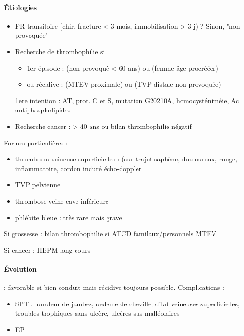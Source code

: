 \documentclass{article}
\begin{document}

\paragraph{Étiologies}
\begin{itemize}
  \item FR transitoire (chir, fracture < 3 mois, immobilisation > 3 j) ? Sinon, "non
provoquée"
\item Recherche de thrombophilie si
  \begin{itemize}
  \item 1er épisode :  (non provoqué < 60 ans) ou (femme âge procrééer)
  \item ou récidive : (MTEV proximale) ou (TVP distale non provoquée)
  \end{itemize}
  \thus 1ere intention : \gls{AT}, prot. C et S, mutation G20210A,
  homocysténiméie, Ac antiphospholipides
\item Recherche cancer : > 40 ans ou bilan thrombophilie négatif
\end{itemize}

Formes particulières :
\begin{itemize}
  \item thromboses veineuse superficielles : (sur trajet saphène, douloureux,
    rouge, inflammatoire, cordon induré \thus écho-doppler
  \item TVP pelvienne
  \item thrombose veine cave inférieure
  \item phlébite bleue : très rare mais grave
\end{itemize}

Si grossesse : bilan thrombophilie si ATCD familaux/personnels MTEV

Si cancer : HBPM long cours

\paragraph{Évolution} : favorable si bien conduit mais récidive toujours
possible. Complications : 
\begin{itemize}
  \item SPT : lourdeur de jambes, oedeme de cheville, dilat veineuses
    superficielles, troubles trophiques sans ulcère, ulcères sus-malléolaires
  \item EP
\end{itemize}
\end{document}

